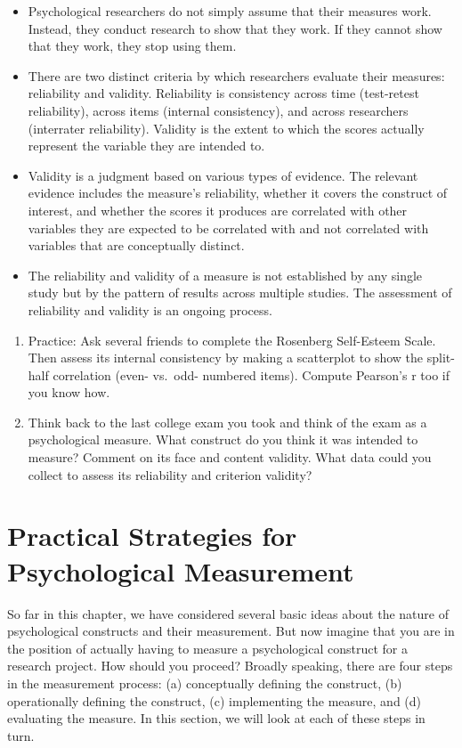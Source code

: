 \documentclass[]{book}
\theoremstyle{definition}
\theoremstyle{definition}
\theoremstyle{remark}
\begin{document}
\begin{itemize}
\item
  Psychological researchers do not simply assume that their measures
  work. Instead, they conduct research to show that they work. If they
  cannot show that they work, they stop using them.
\item
  There are two distinct criteria by which researchers evaluate their
  measures: reliability and validity. Reliability is consistency across
  time (test-retest reliability), across items (internal consistency),
  and across researchers (interrater reliability). Validity is the
  extent to which the scores actually represent the variable they are
  intended to.
\item
  Validity is a judgment based on various types of evidence. The
  relevant evidence includes the measure's reliability, whether it
  covers the construct of interest, and whether the scores it produces
  are correlated with other variables they are expected to be correlated
  with and not correlated with variables that are conceptually distinct.
\item
  The reliability and validity of a measure is not established by any
  single study but by the pattern of results across multiple studies.
  The assessment of reliability and validity is an ongoing process.
\end{itemize}

\begin{enumerate}
\def\labelenumi{\arabic{enumi}.}
\item
  Practice: Ask several friends to complete the Rosenberg Self-Esteem
  Scale. Then assess its internal consistency by making a scatterplot to
  show the split-half correlation (even- vs.~odd- numbered items).
  Compute Pearson's r too if you know how.
\item
  Think back to the last college exam you took and think of the exam as
  a psychological measure. What construct do you think it was intended
  to measure? Comment on its face and content validity. What data could
  you collect to assess its reliability and criterion validity?
\end{enumerate}

\chapter{Practical Strategies for Psychological
Measurement}\label{practical-strategies-for-psychological-measurement}

So far in this chapter, we have considered several basic ideas about the
nature of psychological constructs and their measurement. But now
imagine that you are in the position of actually having to measure a
psychological construct for a research project. How should you proceed?
Broadly speaking, there are four steps in the measurement process: (a)
conceptually defining the construct, (b) operationally defining the
construct, (c) implementing the measure, and (d) evaluating the measure.
In this section, we will look at each of these steps in turn.
\end{document}
